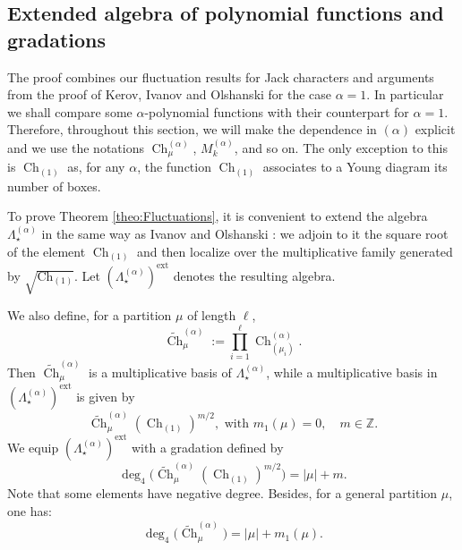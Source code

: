 \documentclass[11pt]{amsart}
\theoremstyle{plain}
\theoremstyle{remark}
\newcommand{\Z}{\mathbb{Z}}
\newcommand{\Pola}{\Lambda_\star^{(\alpha)}}
\newcommand{\Polaext}{\left(\Lambda_\star^{(\alpha)}\right)^{\ext}}
\DeclareMathOperator{\Ch}{Ch}
\DeclareMathOperator{\ext}{ext}
\begin{document}
\subsection{Extended algebra of polynomial functions and gradations }

The proof combines our fluctuation results for Jack characters
and arguments from the proof of Kerov, Ivanov and Olshanski for the case $\alpha=1$.
In particular we shall compare some $\alpha$-polynomial functions with their counterpart for $\alpha=1$.
Therefore, throughout this section, we will make the dependence in $(\alpha)$ explicit and 
we use the notations $\Ch_\mu^{(\alpha)}$, $M_k^{(\alpha)}$, and so on.
The only exception to this is $\Ch_{(1)}$ as, for any $\alpha$, the function $\Ch_{(1)}$ associates
to a Young diagram its number of boxes.

To prove Theorem \ref{theo:Fluctuations},
it is convenient to extend the algebra $\Pola$ in the same way as Ivanov and Olshanski \cite{IvanovOlshanski2002}: we adjoin to it the square root of
the element $\Ch_{(1)}$ and then localize over the multiplicative family generated by $\sqrt{\Ch_{(1)}}$. Let $\Polaext$ denotes the resulting algebra.

We also define, for a partition $\mu$ of length $\ell$,
\[\widetilde{\Ch}^{(\alpha)}_\mu := \prod_{i=1}^\ell \Ch^{(\alpha)}_{(\mu_i)}.\]
Then $\widetilde{\Ch}^{(\alpha)}_\mu$ is a multiplicative basis of $\Pola$,
while a multiplicative basis in $\Polaext$ is given by
\[ \widetilde{\Ch}^{(\alpha)}_\mu \left(\Ch_{(1)}\right)^{m/2},\text{ with } m_1(\mu)=0, \quad m \in \Z.\]
We equip $\Polaext$ with a gradation defined by
\[ \deg_4\bigg( \widetilde{\Ch}^{(\alpha)}_\mu \left(\Ch_{(1)}\right)^{m/2}\bigg) = |\mu| + m.\]
Note that some elements have negative degree.
Besides, for a general partition $\mu$, one has:
\[ \deg_4\big( \widetilde{\Ch}^{(\alpha)}_\mu \big) = |\mu| + m_1(\mu).\]
\end{document}
